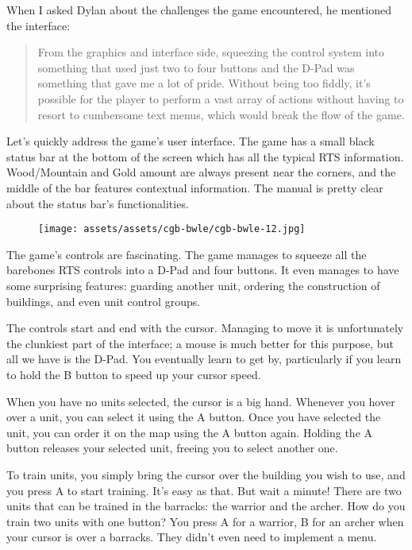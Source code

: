 \documentclass{book}
\begin{document}
When I asked Dylan about the challenges the game encountered, he mentioned the interface:

\begin{quote}
From the graphics and interface side, squeezing the control system into something that used just two to four buttons and the D-Pad was something that gave me a lot of pride. Without being too fiddly, it’s possible for the player to perform a vast array of actions without having to resort to cumbersome text menus, which would break the flow of the game.
\end{quote} \par

Let’s quickly address the game’s user interface. The game has a small black status bar at the bottom of the screen which has all the typical RTS information. Wood/Mountain and Gold amount are always present near the corners, and the middle of the bar features contextual information. The manual is pretty clear about the status bar’s functionalities.

\begin{figure}[hbt]
\vskip 10pt
\centering \texttt{[image: assets/assets/cgb-bwle/cgb-bwle-12.jpg]}
\vskip 6pt
\end{figure}

The game’s controls are fascinating. The game manages to squeeze all the barebones RTS controls into a D-Pad and four buttons. It even manages to have some surprising features: guarding another unit, ordering the construction of buildings, and even unit control groups.

The controls start and end with the cursor. Managing to move it is unfortunately the clunkiest part of the interface; a mouse is much better for this purpose, but all we have is the D-Pad. You eventually learn to get by, particularly if you learn to hold the B button to speed up your cursor speed.

When you have no units selected, the cursor is a big hand. Whenever you hover over a unit, you can select it using the A button. Once you have selected the unit, you can order it on the map using the A button again. Holding the A button releases your selected unit, freeing you to select another one.

To train units, you simply bring the cursor over the building you wish to use, and you press A to start training. It’s easy as that. But wait a minute! There are two units that can be trained in the barracks: the warrior and the archer. How do you train two units with one button? You press A for a warrior, B for an archer when your cursor is over a barracks. They didn’t even need to implement a menu.
\end{document}
